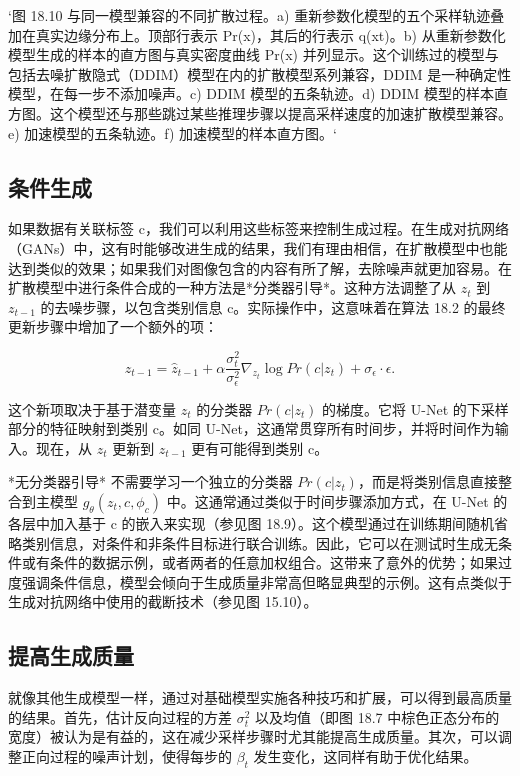 `图 18.10 与同一模型兼容的不同扩散过程。a) 重新参数化模型的五个采样轨迹叠加在真实边缘分布上。顶部行表示 Pr(x)，其后的行表示 q(xt)。b) 从重新参数化模型生成的样本的直方图与真实密度曲线 Pr(x) 并列显示。这个训练过的模型与包括去噪扩散隐式（DDIM）模型在内的扩散模型系列兼容，DDIM 是一种确定性模型，在每一步不添加噪声。c) DDIM 模型的五条轨迹。d) DDIM 模型的样本直方图。这个模型还与那些跳过某些推理步骤以提高采样速度的加速扩散模型兼容。e) 加速模型的五条轨迹。f) 加速模型的样本直方图。`

\subsection{条件生成}
如果数据有关联标签 c，我们可以利用这些标签来控制生成过程。在生成对抗网络（GANs）中，这有时能够改进生成的结果，我们有理由相信，在扩散模型中也能达到类似的效果；如果我们对图像包含的内容有所了解，去除噪声就更加容易。在扩散模型中进行条件合成的一种方法是*分类器引导*。这种方法调整了从 \(z_t\) 到 \(z_{t-1}\) 的去噪步骤，以包含类别信息 c。实际操作中，这意味着在算法 18.2 的最终更新步骤中增加了一个额外的项：

\begin{equation}
z_{t-1} = \hat{z}_{t-1} + \alpha \frac{\sigma^2_t}{\sigma^2_{\epsilon}} \nabla_{z_t} \log Pr(c|z_t) + \sigma_{\epsilon} \cdot \epsilon. 
\end{equation}

这个新项取决于基于潜变量 \(z_t\) 的分类器 \(Pr(c|z_t)\) 的梯度。它将 U-Net 的下采样部分的特征映射到类别 c。如同 U-Net，这通常贯穿所有时间步，并将时间作为输入。现在，从 \(z_t\) 更新到 \(z_{t-1}\) 更有可能得到类别 c。

*无分类器引导* 不需要学习一个独立的分类器 \(Pr(c|z_t)\)，而是将类别信息直接整合到主模型 \(g_{\theta}(z_t, c, \phi_c)\) 中。这通常通过类似于时间步骤添加方式，在 U-Net 的各层中加入基于 c 的嵌入来实现（参见图 18.9）。这个模型通过在训练期间随机省略类别信息，对条件和非条件目标进行联合训练。因此，它可以在测试时生成无条件或有条件的数据示例，或者两者的任意加权组合。这带来了意外的优势；如果过度强调条件信息，模型会倾向于生成质量非常高但略显典型的示例。这有点类似于生成对抗网络中使用的截断技术（参见图 15.10）。

\subsection{提高生成质量}
就像其他生成模型一样，通过对基础模型实施各种技巧和扩展，可以得到最高质量的结果。首先，估计反向过程的方差 \(\sigma_t^2\) 以及均值（即图 18.7 中棕色正态分布的宽度）被认为是有益的，这在减少采样步骤时尤其能提高生成质量。其次，可以调整正向过程的噪声计划，使得每步的 \(\beta_t\) 发生变化，这同样有助于优化结果。

